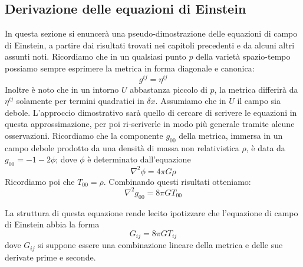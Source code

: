 \documentclass[]{report}
\theoremstyle{definition}
\theoremstyle{Theorem}
\theoremstyle{definition}
\theoremstyle{definition}
\theoremstyle{definition}
\begin{document}
\subsection{Derivazione delle equazioni di Einstein}
In questa sezione si enuncerà una pseudo-dimostrazione delle equazioni di campo di Einstein, a partire dai risultati trovati nei capitoli precedenti e da alcuni altri assunti noti.
Ricordiamo che in un qualsiasi punto $p$ della varietà spazio-tempo possiamo sempre esprimere la metrica in forma diagonale e canonica:
$$g^{ij}=\eta^{ij}$$
Inoltre è noto che in un intorno $U$ abbastanza piccolo di $p$, la metrica differirà da $\eta^{ij}$ solamente per termini quadratici in $\delta x$. Assumiamo che in $U$ il campo sia debole. L'approccio dimostrativo sarà quello di cercare di scrivere le equazioni in questa  approssimazione, per poi ri-scriverle in modo più generale tramite alcune osservazioni. Ricordiamo che la componente $g_{00}$ della metrica, immersa in un campo debole prodotto da una densità di massa non relativistica $\rho$, è data da $g_{00}=-1-2\phi$; dove $\phi$ è determinato dall'equazione $$\nabla^2\phi=4\pi G\rho$$
Ricordiamo poi che $T_{00}=\rho$. Combinando questi risultati otteniamo:
\begin{equation}\label{Equation 1}
	\nabla^2g_{00}=8\pi GT_{00}
\end{equation}

La struttura di questa equazione rende lecito ipotizzare che l'equazione di campo di Einstein abbia la forma 
$$G_{ij}=8\pi GT_{ij}$$
dove $G_{ij}$ si suppone essere una combinazione lineare della metrica e delle sue derivate prime e seconde.
\end{document}
